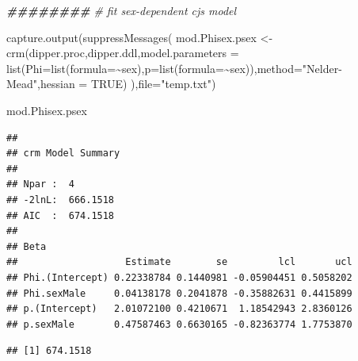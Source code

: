 \documentclass[
]{article}
\newenvironment{Shaded}{\begin{snugshade}}{\end{snugshade}}
\newcommand{\AttributeTok}[1]{\textcolor[rgb]{0.77,0.63,0.00}{#1}}
\newcommand{\CommentTok}[1]{\textcolor[rgb]{0.56,0.35,0.01}{\textit{#1}}}
\newcommand{\ConstantTok}[1]{\textcolor[rgb]{0.00,0.00,0.00}{#1}}
\newcommand{\DocumentationTok}[1]{\textcolor[rgb]{0.56,0.35,0.01}{\textbf{\textit{#1}}}}
\newcommand{\FunctionTok}[1]{\textcolor[rgb]{0.00,0.00,0.00}{#1}}
\newcommand{\NormalTok}[1]{#1}
\newcommand{\OtherTok}[1]{\textcolor[rgb]{0.56,0.35,0.01}{#1}}
\newcommand{\SpecialCharTok}[1]{\textcolor[rgb]{0.00,0.00,0.00}{#1}}
\newcommand{\StringTok}[1]{\textcolor[rgb]{0.31,0.60,0.02}{#1}}
\begin{document}
\begin{Shaded}
\begin{Highlighting}[]
\DocumentationTok{\#\#\#\#\#\#\#\#}
\CommentTok{\# fit sex{-}dependent cjs model}

\FunctionTok{capture.output}\NormalTok{(}\FunctionTok{suppressMessages}\NormalTok{(}
\NormalTok{  mod.Phisex.psex }\OtherTok{\textless{}{-}} \FunctionTok{crm}\NormalTok{(dipper.proc,dipper.ddl,}\AttributeTok{model.parameters =} \FunctionTok{list}\NormalTok{(}\AttributeTok{Phi=}\FunctionTok{list}\NormalTok{(}\AttributeTok{formula=}\SpecialCharTok{\textasciitilde{}}\NormalTok{sex),}\AttributeTok{p=}\FunctionTok{list}\NormalTok{(}\AttributeTok{formula=}\SpecialCharTok{\textasciitilde{}}\NormalTok{sex)),}\AttributeTok{method=}\StringTok{"Nelder{-}Mead"}\NormalTok{,}\AttributeTok{hessian =} \ConstantTok{TRUE}\NormalTok{)}
\NormalTok{),}\AttributeTok{file=}\StringTok{"temp.txt"}\NormalTok{)}

\NormalTok{mod.Phisex.psex}
\end{Highlighting}
\end{Shaded}

\begin{verbatim}
## 
## crm Model Summary
## 
## Npar :  4
## -2lnL:  666.1518
## AIC  :  674.1518
## 
## Beta
##                   Estimate        se         lcl       ucl
## Phi.(Intercept) 0.22338784 0.1440981 -0.05904451 0.5058202
## Phi.sexMale     0.04138178 0.2041878 -0.35882631 0.4415899
## p.(Intercept)   2.01072100 0.4210671  1.18542943 2.8360126
## p.sexMale       0.47587463 0.6630165 -0.82363774 1.7753870
\end{verbatim}

\begin{Shaded}
\end{Shaded}

\begin{verbatim}
## [1] 674.1518
\end{verbatim}
\end{document}
